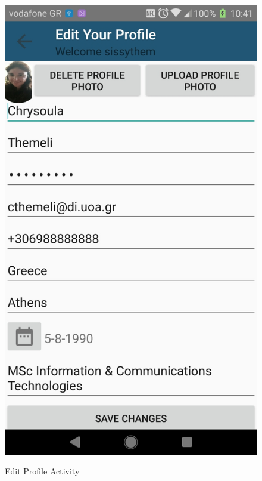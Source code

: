 \documentclass[12pt]{article}
\begin{document}
	\begin{figure} [H]
		\begin{center}
			\includegraphics [scale = 0.18] {21-editProfile.jpg}\\[1.0 cm]
			\caption{Edit Profile Activity}
		\end{center}
	\end{figure}
	
\end{document}
